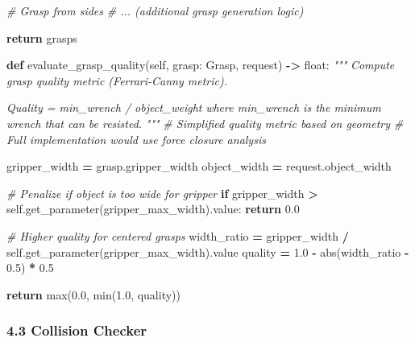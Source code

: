 \documentclass[
]{article}
\newenvironment{Shaded}{\begin{snugshade}}{\end{snugshade}}
\newcommand{\BuiltInTok}[1]{#1}
\newcommand{\CommentTok}[1]{\textcolor[rgb]{0.56,0.35,0.01}{\textit{#1}}}
\newcommand{\ControlFlowTok}[1]{\textcolor[rgb]{0.13,0.29,0.53}{\textbf{#1}}}
\newcommand{\FloatTok}[1]{\textcolor[rgb]{0.00,0.00,0.81}{#1}}
\newcommand{\KeywordTok}[1]{\textcolor[rgb]{0.13,0.29,0.53}{\textbf{#1}}}
\newcommand{\NormalTok}[1]{#1}
\newcommand{\OperatorTok}[1]{\textcolor[rgb]{0.81,0.36,0.00}{\textbf{#1}}}
\newcommand{\StringTok}[1]{\textcolor[rgb]{0.31,0.60,0.02}{#1}}
\newcommand{\VariableTok}[1]{\textcolor[rgb]{0.00,0.00,0.00}{#1}}
\begin{document}
\begin{Shaded}
\begin{Highlighting}[]
        \CommentTok{\# Grasp from sides}
        \CommentTok{\# ... (additional grasp generation logic)}

        \ControlFlowTok{return}\NormalTok{ grasps}

    \KeywordTok{def}\NormalTok{ evaluate\_grasp\_quality(}\VariableTok{self}\NormalTok{, grasp: Grasp, request) }\OperatorTok{{-}\textgreater{}} \BuiltInTok{float}\NormalTok{:}
        \CommentTok{"""}
\CommentTok{        Compute grasp quality metric (Ferrari{-}Canny metric).}

\CommentTok{        Quality = min\_wrench / object\_weight}
\CommentTok{        where min\_wrench is the minimum wrench that can be resisted.}
\CommentTok{        """}
        \CommentTok{\# Simplified quality metric based on geometry}
        \CommentTok{\# Full implementation would use force closure analysis}

\NormalTok{        gripper\_width }\OperatorTok{=}\NormalTok{ grasp.gripper\_width}
\NormalTok{        object\_width }\OperatorTok{=}\NormalTok{ request.object\_width}

        \CommentTok{\# Penalize if object is too wide for gripper}
        \ControlFlowTok{if}\NormalTok{ gripper\_width }\OperatorTok{\textgreater{}} \VariableTok{self}\NormalTok{.get\_parameter(}\StringTok{\textquotesingle{}gripper\_max\_width\textquotesingle{}}\NormalTok{).value:}
            \ControlFlowTok{return} \FloatTok{0.0}

        \CommentTok{\# Higher quality for centered grasps}
\NormalTok{        width\_ratio }\OperatorTok{=}\NormalTok{ gripper\_width }\OperatorTok{/} \VariableTok{self}\NormalTok{.get\_parameter(}\StringTok{\textquotesingle{}gripper\_max\_width\textquotesingle{}}\NormalTok{).value}
\NormalTok{        quality }\OperatorTok{=} \FloatTok{1.0} \OperatorTok{{-}} \BuiltInTok{abs}\NormalTok{(width\_ratio }\OperatorTok{{-}} \FloatTok{0.5}\NormalTok{) }\OperatorTok{*} \FloatTok{0.5}

        \ControlFlowTok{return} \BuiltInTok{max}\NormalTok{(}\FloatTok{0.0}\NormalTok{, }\BuiltInTok{min}\NormalTok{(}\FloatTok{1.0}\NormalTok{, quality))}
\end{Highlighting}
\end{Shaded}

\hypertarget{collision-checker}{%
\subsubsection{4.3 Collision Checker}\label{collision-checker}}
\end{document}
